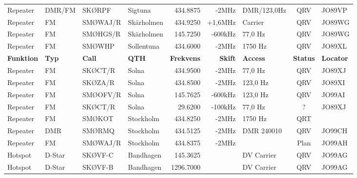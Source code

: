 \documentclass[10pt,swedish,a4paper,twoside]{article}
\begin{document}
\begin{landscape}
\begin{longtable}{llllrrlcl}
	Repeater          & DMR/FM       & SKØRPF        & Sigtuna      &          434.8875 &          -2MHz & DMR/123,0Hz    &       QRV       & JO89VP           \\
	Repeater          & FM           & SMØWAJ/R      & Skärholmen   &          434.9250 &        +1,6MHz & Carrier         &       QRV       & JO89WG           \\
	Repeater          & FM           & SMØHGS/R      & Skärholmen   &          145.7250 &        -600kHz & 77,0 Hz         &       QRV       & JO89WG           \\
	Repeater          & FM           & SMØWHP        & Sollentuna   &          434.6000 &          -2MHz & 1750 Hz         &       QRV       & JO89XL           \\
	\textbf{Funktion} & \textbf{Typ} & \textbf{Call} & \textbf{QTH} & \textbf{Frekvens} & \textbf{Skift} & \textbf{Access} & \textbf{Status} & \textbf{Locator} \\ \hline
	Repeater          & FM           & SKØCT/R       & Solna        &          434.9500 &          -2MHz & 77,0 Hz         &       QRV       & JO89XJ           \\
	Repeater          & FM           & SKØZA/R       & Solna        &          434.8500 &          -2MHz & 123,0 Hz        &       QRV       & JO89XI           \\
	Repeater          & FM           & SMØOFV/R      & Solna        &          145.7625 &        -600kHz & 123,0 Hz        &       QRV       & JO99AI           \\
Repeater          & FM           & SKØCT/R       & Solna        &           29.6200 &        -100kHz & 77,0 Hz         &        ?        & JO89XJ           \\
	Repeater          & FM           & SMØKOT        & Stockholm    &          434.8250 &          -2MHz & 1750 Hz         &       QRT       &  \\
	Repeater          & DMR          & SMØRMQ        & Stockholm    &          434.5125 &          -2MHz & DMR 240010      &       QRV       & JO99CH           \\
	Repeater          & FM           & SMØWAJ/R      & Stockholm    &          434.8375 &          -2MHz &                 &      Plan       & JO99AH           \\
	Hotspot           & D-Star       & SKØVF-C       & Bandhagen    &          145.3625 &                & DV Carrier      &       QRV       & JO99AG           \\
	Hotspot           & D-Star       & SKØVF-B       & Bandhagen    &         1296.7000 &                & DV Carrier      &       QRV       & JO99AG           \\

\end{longtable}
\end{landscape}
\end{document}
